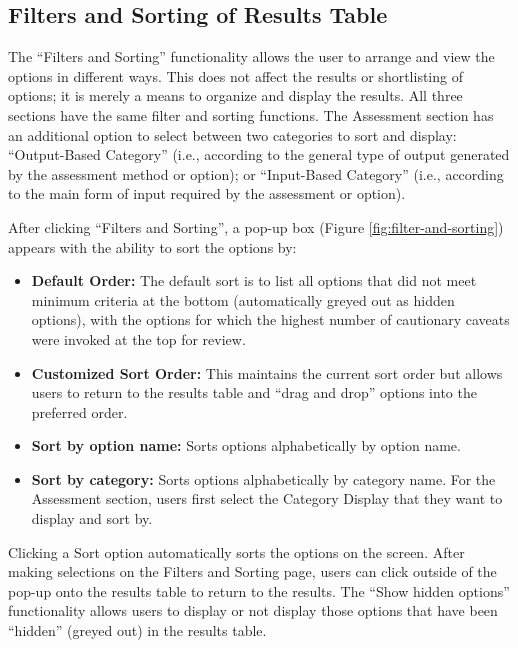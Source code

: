 \documentclass[11pt,]{book}
\providecommand{\tightlist}{%
  \setlength{\itemsep}{0pt}\setlength{\parskip}{0pt}}
\begin{document}
\hypertarget{filters-and-sorting-of-results-table}{%
\subsection{Filters and Sorting of Results Table}\label{filters-and-sorting-of-results-table}}

The ``Filters and Sorting'' functionality allows the user to arrange and view the options in different ways. This does not affect the results or shortlisting of options; it is merely a means to organize and display the results. All three sections have the same filter and sorting functions. The Assessment section has an additional option to select between two categories to sort and display: ``Output-Based Category'' (i.e., according to the general type of output generated by the assessment method or option); or ``Input-Based Category'' (i.e., according to the main form of input required by the assessment or option).

After clicking ``Filters and Sorting'', a pop-up box (Figure \ref{fig:filter-and-sorting}) appears with the ability to sort the options by:

\begin{itemize}
\tightlist
\item
  \textbf{Default Order:} The default sort is to list all options that did not meet minimum criteria at the bottom (automatically greyed out as hidden options), with the options for which the highest number of cautionary caveats were invoked at the top for review.
\item
  \textbf{Customized Sort Order:} This maintains the current sort order but allows users to return to the results table and ``drag and drop'' options into the preferred order.
\item
  \textbf{Sort by option name:} Sorts options alphabetically by option name.
\item
  \textbf{Sort by category:} Sorts options alphabetically by category name. For the Assessment section, users first select the Category Display that they want to display and sort by.
\end{itemize}

Clicking a Sort option automatically sorts the options on the screen. After making selections on the Filters and Sorting page, users can click outside of the pop-up onto the results table to return to the results.
The ``Show hidden options'' functionality allows users to display or not display those options that have been ``hidden'' (greyed out) in the results table.
\end{document}
